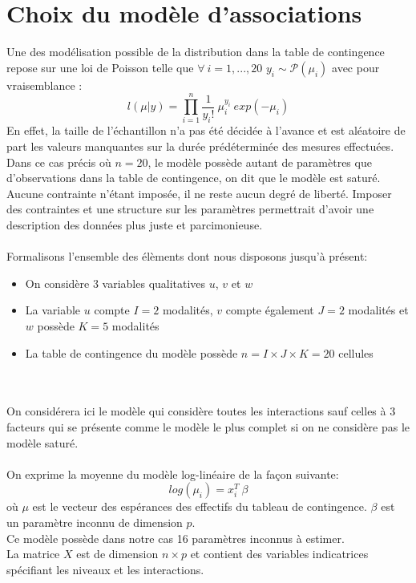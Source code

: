 \documentclass[french,12pt]{report}
\newcommand{\<}{\langle}
\renewcommand{\>}{\rangle}
\theoremstyle{definition}
\begin{document}
\chapter{Choix du modèle d'associations}

Une des modélisation possible de la distribution dans la table de contingence repose sur une loi de Poisson telle que $\forall \ i = 1,...,20$ $y_i \sim  \mathcal{P}(\mu_i) $ avec pour vraisemblance : 
$$l(\mu|y) = \prod_{i=1}^n \frac{1}{y_i ! } \ \mu_i^{y_i} \ exp(-\mu_i)$$
En effet, la taille de l'échantillon  n'a pas été décidée à l'avance et est aléatoire de part les valeurs manquantes sur la durée prédéterminée des mesures effectuées.
Dans ce cas précis où $n=20$, le modèle possède autant de paramètres que d'observations dans la table de contingence, on dit que le modèle est saturé. Aucune contrainte n'étant imposée, il ne reste aucun degré de liberté. Imposer des contraintes et une structure sur les paramètres permettrait d'avoir une description des données plus juste et parcimonieuse.\\
\\
Formalisons l'ensemble des élèments dont nous disposons jusqu'à présent:
\begin{itemize}
    \item On considère 3 variables qualitatives $u$, $v$ et $w$
    \item La variable $u$ compte $I=2$ modalités, $v$ compte également $J=2$ modalités et $w$ possède $K=5$ modalités
    \item La table de contingence du modèle possède $n = I \times J \times K = 20$ cellules
\end{itemize}
\\
\\
On considérera ici le modèle qui considère toutes les interactions sauf celles à 3 facteurs qui se présente comme le modèle le plus complet si on ne considère pas le modèle saturé.\\
\\
On exprime la moyenne du modèle log-linéaire de la façon suivante:
$$log(\mu_i)=x^T_i \ \beta $$
où $\mu$ est le vecteur des espérances des effectifs du tableau de contingence. $\beta$ est un paramètre inconnu de dimension $p$.\\
Ce modèle possède dans notre cas 16 paramètres inconnus à estimer.\\
La matrice $X$ est de dimension $n\times p$ et contient des variables indicatrices spécifiant les niveaux et les interactions.\\
\end{document}
